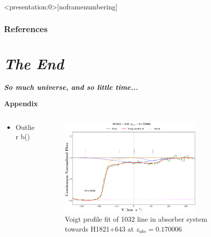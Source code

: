 \documentclass[aspectratio=169]{beamer}
\newcommand\ion[2]{\text{#1\,\textsc{\lowercase{#2}}}}
\begin{document}

\begin{frame}<presentation:0>[noframenumbering]

{\cite{Lehner-2007} \cite{Richter-2006} \cite{savage-2014} \cite{danforth-2016} \cite{acharya_khaire}}
    
\end{frame}
    


\begin{frame}
\renewcommand{\bibfont}{\footnotesize}
\frametitle{\huge{\textbf{References}}}




\end{frame}

\section{\textit{The End}}

\begin{frame}{}
  \centering \Huge
  \textbf{\emph{So much universe, and so little time...}}
\end{frame}


\begin{frame}{\huge{{\textbf{Appendix}}}}

  \begin{columns}
    \begin{column}{0.3\textwidth} 
      \vspace*{-20mm}
    
    \begin{itemize}
      \item Outlier b(\ion{O}{vi})
    \end{itemize}
      
      
    \end{column}      
  
    \begin{column}{0.7\textwidth}
  
      \begin{figure}[!htbp]
        \centering
        \includegraphics[width=7cm]{Figures/H1821+643_z=0.170006_sys_plot.png}
        \vspace*{-1mm}
        \caption{Voigt profile fit of \ion{O}{vi} 1032 line in absorber system towards H1821+643 at $z_{abs}=0.170006$}
      \end{figure}
    \end{column}
  
  \end{columns}

  
\end{frame}


\end{document}
